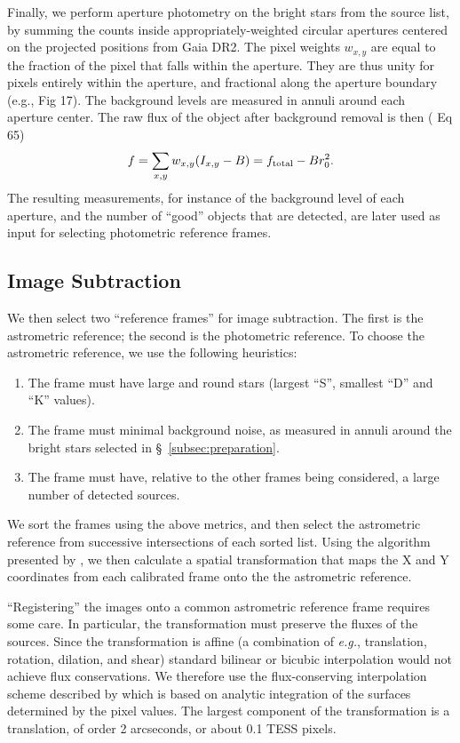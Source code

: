 \documentclass[12pt,twocolumn,tighten]{aastex62}
\begin{document}
Finally, we perform aperture photometry on the bright stars from the
source list, by summing the counts inside appropriately-weighted
circular apertures centered on the projected positions from Gaia DR2. 
The pixel weights $w_{x,y}$ are equal to the fraction of the pixel
that falls within the aperture.  They are thus unity for pixels
entirely within the aperture, and fractional along the aperture
boundary (e.g., \citealt{Pal_2009} Fig 17). 
The background levels are measured in annuli around each aperture
center.  The raw flux of the object after background removal is then
(\citealt{Pal_2009} Eq 65)
\begin{equation}
  f = \sum_{x,y} w_{x,y} (I_{x,y} - B) = f_{\rm total} - B r_0^2.
  \label{eq:simple_aperture_phot}
\end{equation}
The resulting measurements, for instance of the background level of
each aperture, and the number of ``good'' objects that are detected,
are later used as input for selecting photometric reference frames.


\subsection{Image Subtraction}
\label{subsec:imagesubtraction}

We then select two ``reference frames'' for image subtraction.
The first is the astrometric reference; the second is the photometric
reference.
To choose the astrometric reference, we use the following heuristics:
\begin{enumerate}
  \item The frame must have large and round stars (largest ``S'',
    smallest ``D'' and ``K'' values).
  \item The frame must minimal background noise, as measured in annuli
    around the bright stars selected in \S~\ref{subsec:preparation}.
  \item The frame must have, relative to the other frames being
    considered, a large number of detected sources.
\end{enumerate}
We sort the frames using the above metrics, and then select the
astrometric reference from successive intersections of each sorted
list.
Using the algorithm presented by \citet{pal_astrometry_2006}, we then
calculate a spatial transformation that maps the X and Y coordinates
from each calibrated frame onto the the astrometric reference.

``Registering'' the images onto a common astrometric reference frame
requires some care. In particular, the transformation must preserve
the fluxes of the sources. Since the transformation is affine (a
combination of {\it e.g.}, translation, rotation, dilation, and shear)
standard bilinear or bicubic interpolation would not achieve flux
conservations.  We therefore use the flux-conserving interpolation
scheme described by \citet{Pal_2009} which is based on analytic
integration of the surfaces determined by the pixel values. 
The largest component of the transformation is a translation, of order
2 arcseconds, or about 0.1 TESS pixels.
\end{document}
